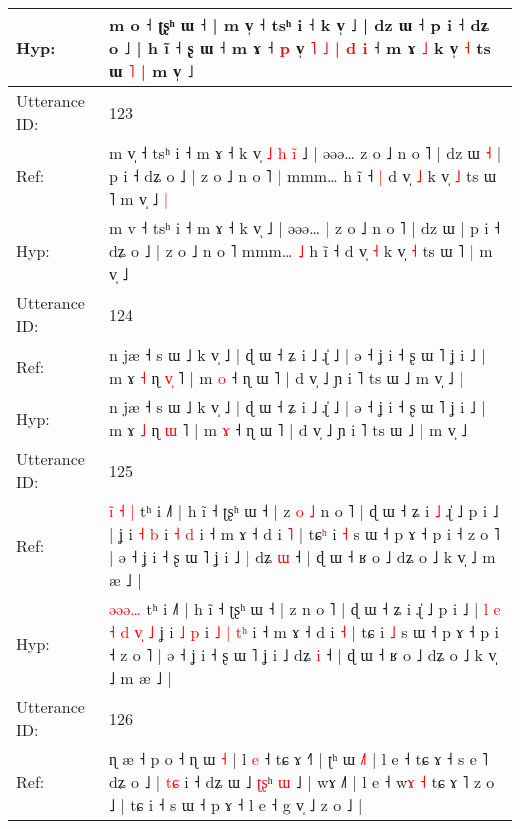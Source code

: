 \documentclass[10pt]{article}
\DeclareRobustCommand{\hl}[1]{{\textcolor{red}{#1}}}
\begin{document}
\begin{longtable}{ll}
 \\
Hyp: & m o ˧ ʈʂʰ ɯ ˧ | m v̩ ˧ tsʰ i ˧ k v̩\hl{}\hl{}\hl{}\hl{}\hl{}\hl{}\hl{} ˩ | dz ɯ ˧\hl{}\hl{} p i ˧ dʑ o ˩ | h ĩ ˧\hl{}\hl{} ʂ ɯ ˧ m ɤ ˧ \hl{p} v̩\hl{ }\hl{˥} \hl{˩} \hl{|} \hl{d}\hl{ }\hl{i} ˧ m ɤ \hl{˩} k v̩ \hl{˧} ts ɯ\hl{ }\hl{˥} \hl{|} m v̩ ˩\hl{}\hl{}
 \\
\midrule
Utterance ID: & 123 \\
Ref: & m v\hl{̩} ˧ tsʰ i ˧ m ɤ ˧ k v̩\hl{ }\hl{˩}\hl{ }\hl{h}\hl{ }\hl{i}\hl{̃} ˩ | əəə…\hl{}\hl{} z o ˩ n o ˥ | dz ɯ\hl{ }\hl{˧} | p i ˧ dʑ o ˩ | z o ˩ n o ˥\hl{ }\hl{|} mmm…\hl{}\hl{} h ĩ ˧\hl{ }\hl{|} d v̩ \hl{˩} k v̩ \hl{˩} ts ɯ ˥\hl{}\hl{} m v̩ ˩\hl{ }\hl{|}
 \\
Hyp: & m v\hl{} ˧ tsʰ i ˧ m ɤ ˧ k v̩\hl{}\hl{}\hl{}\hl{}\hl{}\hl{}\hl{} ˩ | əəə…\hl{ }\hl{|} z o ˩ n o ˥ | dz ɯ\hl{}\hl{} | p i ˧ dʑ o ˩ | z o ˩ n o ˥\hl{}\hl{} mmm…\hl{ }\hl{˩} h ĩ ˧\hl{}\hl{} d v̩ \hl{˧} k v̩ \hl{˧} ts ɯ ˥\hl{ }\hl{|} m v̩ ˩\hl{}\hl{}
 \\
\midrule
Utterance ID: & 124 \\
Ref: & n jæ ˧ s ɯ ˩ k v̩ ˩ | ɖ ɯ ˧ ʑ i ˩ ɻ̍ ˩ | ə ˧ ʝ i ˧ ʂ ɯ ˥ ʝ i ˩ | m ɤ \hl{˧} ɳ \hl{v}\hl{̩} ˥ | m \hl{o} ˧ ɳ ɯ ˥ | d v̩ ˩ ɲ i ˥ ts ɯ ˩\hl{}\hl{} m v̩ ˩\hl{ }\hl{|}
 \\
Hyp: & n jæ ˧ s ɯ ˩ k v̩ ˩ | ɖ ɯ ˧ ʑ i ˩ ɻ̍ ˩ | ə ˧ ʝ i ˧ ʂ ɯ ˥ ʝ i ˩ | m ɤ \hl{˩} ɳ \hl{}\hl{ɯ} ˥ | m \hl{ɤ} ˧ ɳ ɯ ˥ | d v̩ ˩ ɲ i ˥ ts ɯ ˩\hl{ }\hl{|} m v̩ ˩\hl{}\hl{}
 \\
\midrule
Utterance ID: & 125 \\
Ref: & \hl{i}\hl{̃}\hl{ }\hl{˧}\hl{ }\hl{|} tʰ i ˩˥ | h ĩ ˧ ʈʂʰ ɯ ˧ | z\hl{ }\hl{o}\hl{ }\hl{˩} n o ˥ | ɖ ɯ ˧ ʑ i\hl{ }\hl{˩} ɻ̍ ˩ p i ˩ |\hl{}\hl{}\hl{}\hl{}\hl{}\hl{}\hl{}\hl{}\hl{}\hl{}\hl{}\hl{}\hl{} ʝ i \hl{˧} \hl{b} i\hl{}\hl{} \hl{˧} \hl{}\hl{d} i ˧ m ɤ ˧ d i \hl{˥} | tɕ\hl{ʰ} i \hl{˧} s ɯ ˧ p ɤ ˧ p i ˧ z o ˥ | ə ˧ ʝ i ˧ ʂ ɯ ˥ ʝ i ˩\hl{ }\hl{|} dʑ \hl{ɯ} ˧ | ɖ ɯ ˧ ʁ o ˩ dʑ o ˩ k v̩ ˩ m æ ˩ |
 \\
Hyp: & \hl{}\hl{}\hl{ə}\hl{ə}\hl{ə}\hl{…} tʰ i ˩˥ | h ĩ ˧ ʈʂʰ ɯ ˧ | z\hl{}\hl{}\hl{}\hl{} n o ˥ | ɖ ɯ ˧ ʑ i\hl{}\hl{} ɻ̍ ˩ p i ˩ |\hl{ }\hl{l}\hl{ }\hl{e}\hl{ }\hl{˧}\hl{ }\hl{d}\hl{ }\hl{v}\hl{̩}\hl{ }\hl{˩} ʝ i \hl{˩} \hl{p} i\hl{ }\hl{˩} \hl{|} \hl{t}\hl{ʰ} i ˧ m ɤ ˧ d i \hl{˧} | tɕ\hl{} i \hl{˩} s ɯ ˧ p ɤ ˧ p i ˧ z o ˥ | ə ˧ ʝ i ˧ ʂ ɯ ˥ ʝ i ˩\hl{}\hl{} dʑ \hl{i} ˧ | ɖ ɯ ˧ ʁ o ˩ dʑ o ˩ k v̩ ˩ m æ ˩ |
 \\
\midrule
Utterance ID: & 126 \\
Ref: & ɳ æ ˧ p o ˧ ɳ ɯ \hl{˧} | l \hl{}\hl{e} ˧ tɕ ɤ ˧˥ | ʈʰ ɯ \hl{˩}\hl{˥} | l e ˧ tɕ ɤ ˧ s e ˥ dʑ o ˩ | \hl{t}\hl{ɕ} i ˧ dʑ ɯ ˩ \hl{ʈ}\hl{ʂ}ʰ\hl{}\hl{}\hl{}\hl{}\hl{}\hl{} \hl{}\hl{ɯ} ˩\hl{} | wɤ ˩˥ | l e ˧ w\hl{}\hl{ɤ} \hl{˧} tɕ ɤ ˥ z o ˩ | tɕ i ˧ s ɯ ˧ p ɤ ˧\hl{}\hl{} l e ˧ g v̩ ˩ z o ˩ |

\end{longtable}
\end{document}
